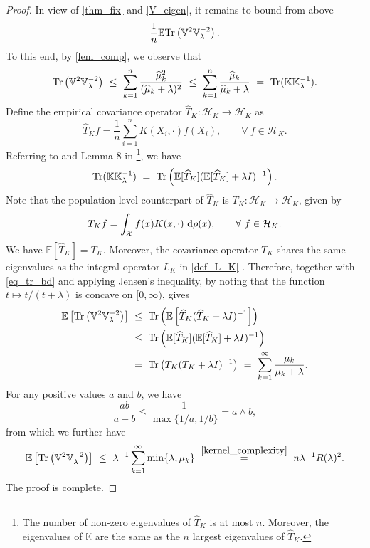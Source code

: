 \documentclass[11pt,twoside]{article}
\def\VV{\mathbb{V}}
\def\KK{\mathbb{K}}
\def\EE{\mathbb{E}}
\def\cH{\mathcal H}
\def\cX{\mathcal{X}}
\def\wh{\widehat}
\def\i{\infty}
\def\tr{{\rm Tr}}
\def\d{~{\rm d}}
\def\l{\left}
\def\r{\right}
\begin{document}
\begin{proof} 
    In view of \cref{thm_fix} and \eqref{V_eigen}, it remains to bound from above  
    \[
        {1\over n}  \EE \tr\l(\VV^2 \VV_\lambda^{-2}\r).
    \]
  To this end,    by  \cref{lem_comp}, we observe that  
    \begin{equation}\label{eq_tr_bd} 
 \tr\l(\VV^2 \VV_\lambda^{-2}\r)
    ~\le  ~    \sum_{k=1}^n \frac{\wh \mu_k^2 }{(\wh \mu_k+\lambda)^2} 
   ~\le~  \sum_{k=1}^n \frac{\wh \mu_k}{\wh \mu_k+\lambda}~ =~\tr( \KK \KK_{\lambda}^{-1}). 
        \end{equation}
Define the empirical covariance operator $\wh T_K:\cH_K \to\cH_K$  as
\[
    \wh T_K f  = \frac{1}{n}\sum_{i=1}^n K(X_i, \cdot) f(X_i) ,\qquad \forall ~f\in \cH_K. 
\]
Referring to \cite{bartlett2005local} and Lemma 8 in \cite{bing2025kernel}\footnote{The number of non-zero eigenvalues of $\wh T_K$ is at most $n$. Moreover, the eigenvalues of  $\KK$ are the same as the $n$ largest eigenvalues of $\wh T_K$.}, we have 
\[
\tr( \KK \KK_{\lambda}^{-1}) ~ =~   \tr\l( \EE[\wh T_K]   (\EE [\wh T_K]  +\lambda I)^{-1} \r) .
\]
Note that the population-level counterpart of $\wh T_K$ is $T_K:\cH_K \to\cH_K $, given by 
$$
    T_K f  = \int_{\cX} f(x)K(x,\cdot) \d \rho (x),\qquad  \forall ~f\in \cH_K. 
$$
We have $\EE[ \wh T_K  ] = T_K$.
Moreover, the covariance operator $T_K$
 shares the same eigenvalues as the integral operator $L_K$ in \eqref{def_L_K} \citep{caponnetto2007optimal}.
Therefore, together with \eqref{eq_tr_bd} and
applying Jensen's inequality, by noting that the function $t\mapsto t/(t+\lambda)$ is concave on $[0,\infty)$,
gives
\begin{align*}
    \EE\l[\tr\l( \VV^2 \VV_\lambda^{-2}\r) \r]& ~\le ~  \tr\l( \EE\l[ \wh T_K  (\wh T_K  +\lambda I)^{-1}\r] \r)\\
    & ~\le ~        \tr\l( \EE[\wh T_K]   (\EE [\wh T_K]  +\lambda I)^{-1} \r)  \\
    &  ~= ~      \tr\l(  T_K   (T_K +\lambda I)^{-1} \r)   ~= ~   \sum_{k=1}^\i \frac{\mu_k}{\mu_k+\lambda}. 
\end{align*}
For any positive values $a$ and $b$, we have
\[
    \frac{ab}{a+b}  \le   \frac{1}{\max\{1/a,1/b\}} = a \wedge b,
\]
from which we  further have
\begin{align} \label{eq_kernel_comple}
  \EE\l[\tr\l( \VV^2  \VV_\lambda^{-2}\r) \r] 
      ~  \le~  \lambda^{-1} \sum_{k=1}^\i \min\{\lambda, \mu_k\} ~  \overset{\eqref{kernel_complexity}}{=}~  n \lambda ^{-1} R(\lambda)^2.
\end{align} 
The proof is complete. 
\end{proof}
\end{document}
